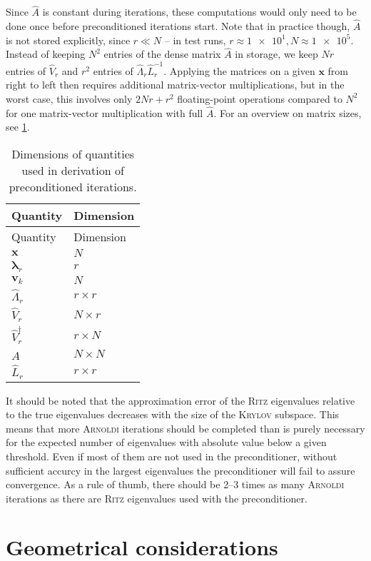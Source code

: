 \documentclass[a4paper, twoside, 10pt, english]{article}
\numberwithin{equation}{section}
\let\vec\symbf
\begin{document}
Since $\hat{A}$ is constant during iterations, these computations would only need to be done once before preconditioned iterations start. Note that in practice though, $\hat{A}$ is not stored explicitly, since $r \ll N$ -- in test runs, $r \approx \num{1e1}, N \approx \num{1e5}$. Instead of keeping $N^2$ entries of the dense matrix $\hat{A}$ in storage, we keep $N r$ entries of $\hat{V}_{r}$ and $r^2$ entries of $\hat{\Lambda}_{r} \hat{L}_{r}^{-1}$. Applying the matrices on a given $\vec{x}$ from right to left then requires additional matrix-vector multiplications, but in the worst case, this involves only $2 N r + r^2$ floating-point operations compared to $N^2$ for one matrix-vector multiplication with full $\hat{A}$. For an overview on matrix sizes, see \cref{tab:matrix_dimensions}.
\begin{longtable}{ll}
  \caption{Dimensions of quantities used in derivation of preconditioned iterations.}
  \label{tab:matrix_dimensions} \\
  \toprule
  Quantity & Dimension \\
  \midrule
  \endfirsthead
  \toprule
  Quantity & Dimension \\
  \midrule
  \endhead
  $\vec{x}$ & $N$ \\
  $\vec{\lambda}_{r}$ & $r$ \\
  $\vec{v}_{k}$ & $N$ \\
  $\hat{\Lambda}_{r}$ & $r \times r$ \\
  $\hat{V}_{r}$ & $N \times r$ \\
  $\hat{V}_{r}^{\dagger}$ & $r \times N$ \\
  $\hat{A}$ & $N \times N$ \\
  $\hat{L}_{r}$ & $r \times r$ \\
  \bottomrule
\end{longtable}
It should be noted that the approximation error of the \textsc{Ritz} eigenvalues relative to the true eigenvalues decreases with the size of the \textsc{Krylov} subspace. This means that more \textsc{Arnoldi} iterations should be completed than is purely necessary for the expected number of eigenvalues with absolute value below a given threshold. Even if most of them are not used in the preconditioner, without sufficient accurcy in the largest eigenvalues the preconditioner will fail to assure convergence. As a rule of thumb, there should be \numrange{2}{3} times as many \textsc{Arnoldi} iterations as there are \textsc{Ritz} eigenvalues used with the preconditioner.

\clearpage
\section{Geometrical considerations}
\end{document}
